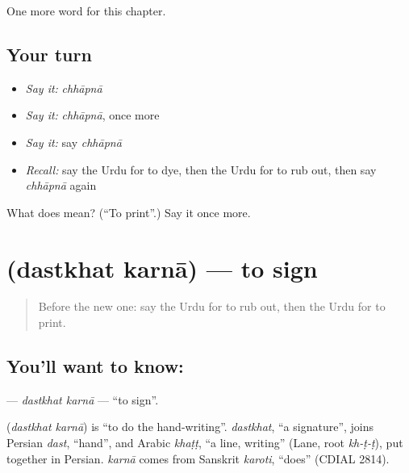 \begin{grammarlens}[title={What you've built}]
One more word for this chapter.
\end{grammarlens}

\subsection*{Your turn}
\begin{itemize}
\raggedright
  \item \emph{Say it:} \emph{chhāpnā}
  \item \emph{Say it:} \emph{chhāpnā}, once more
  \item \emph{Say it:} say \emph{chhāpnā}
  \item \emph{Recall:} say the Urdu for to dye, then the Urdu for to rub out, then say \emph{chhāpnā} again
\end{itemize}

\begin{tcolorbox}[breakable,colback=teal!4,colframe=teal!35!black,title={Before you move on}]
What does  mean? (\textquotedblleft{}To print\textquotedblright{}.) Say it once more.
\end{tcolorbox}
\section[\texorpdfstring{\ur{دستخط} \ur{کرنا} (dastkhat karnā)}{دستخط کرنا (dastkhat karnā)}]{  (dastkhat karnā) — to sign}

\label{lesson:UR-C150-dastkhat-karna}



\begin{quote}
Before the new one: say the Urdu for to rub out, then the Urdu for to print.
\end{quote}

\subsection*{You'll want to know:  }
\textbf{ } — \emph{dastkhat karnā} — \textquotedblleft{}to sign\textquotedblright{}.

\begin{cousinweb}
\textbf{ } (\emph{dastkhat karnā}) is \textquotedblleft{}to do the hand-writing\textquotedblright{}. \emph{dastkhat}, \textquotedblleft{}a signature\textquotedblright{}, joins Persian \emph{dast}, \textquotedblleft{}hand\textquotedblright{}, and Arabic \emph{khaṭṭ}, \textquotedblleft{}a line, writing\textquotedblright{} (Lane, root \emph{kh-ṭ-ṭ}), put together in Persian. \emph{karnā} comes from Sanskrit \emph{karoti}, \textquotedblleft{}does\textquotedblright{} (CDIAL 2814).
\end{cousinweb}

